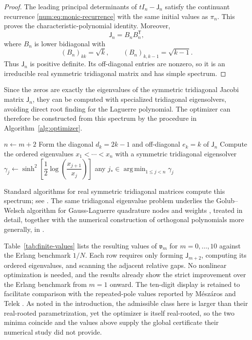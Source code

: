 \documentclass[11pt]{article}
\numberwithin{equation}{section}
\theoremstyle{definition}
\theoremstyle{remark}
\DeclareMathOperator*{\argmin}{arg\,min}
\begin{document}
\begin{proof}
The leading principal determinants of $tI_n-\mathsf J_n$ satisfy the
continuant recurrence \eqref{num:eq:monic-recurrence} with the same initial
values as $\pi_n$. This proves the characteristic-polynomial identity.
Moreover,
\[
 \mathsf J_n=B_nB_n^{\mathsf T},
\]
where $B_n$ is lower bidiagonal with
\[
 (B_n)_{kk}=\sqrt{k},
 \qquad
 (B_n)_{k,k-1}=\sqrt{k-1}.
\]
Thus $\mathsf J_n$ is positive definite. Its off-diagonal entries are
nonzero, so it is an irreducible real symmetric tridiagonal matrix and has
simple spectrum.
\end{proof}

Since the zeros are exactly the eigenvalues of the symmetric tridiagonal
Jacobi matrix $\mathsf J_n$, they can be computed with
specialized tridiagonal eigensolvers, avoiding direct root finding for the
Laguerre polynomial. The optimizer can therefore be constructed from this spectrum by the procedure in Algorithm~\ref{alg:optimizer}.

\begin{algorithm}[htbp]
\caption{Optimizer via the Jacobi spectrum}
\label{alg:optimizer}
\begin{algorithmic}[1]
\State $n \gets m+2$
\State Form the diagonal $d_k=2k-1$ and off-diagonal $e_k=k$ of $\mathsf J_n$
\State Compute the ordered eigenvalues $x_1<\cdots<x_n$ with a symmetric tridiagonal eigensolver
    \State ${\gamma_{j}} \gets \sinh^2\!\left[\dfrac12\log\!\left(\dfrac{x_{j+1}}{x_j}\right)\right]$
\EndFor
\State \Return any $j_* \in \argmin_{1\leq j<n}{\gamma_{j}}$
\end{algorithmic}
\end{algorithm}
Standard algorithms for real symmetric tridiagonal matrices
compute this spectrum; see \cite{lapack1999}.
The same tridiagonal eigenvalue problem underlies the Golub--Welsch algorithm
for Gauss-Laguerre quadrature nodes and weights \cite{golub1969}, treated in detail,
together with the numerical construction of orthogonal polynomials more
generally, in \cite{gautschi2004}.

Table~\ref{tab:finite-values} lists the resulting values of
$\mathfrak v_m$ for $m=0,\ldots,10$ against the Erlang benchmark $1/N$. Each row requires only forming $\mathsf J_{m+2}$, computing its
ordered eigenvalues, and scanning the adjacent relative gaps. No nonlinear
optimization is needed, and the results already show the strict improvement
over the Erlang benchmark from $m=1$ onward. The ten-digit display is retained
to facilitate comparison with the repeated-pole values reported by
M\'esz\'aros and Telek \cite{meszarostelek2022}. As noted in the
introduction, the admissible class here is larger than their real-rooted
parametrization, yet the optimizer is itself real-rooted, so the two minima
coincide and the values above supply the global certificate their numerical
study did not provide.
\end{document}
